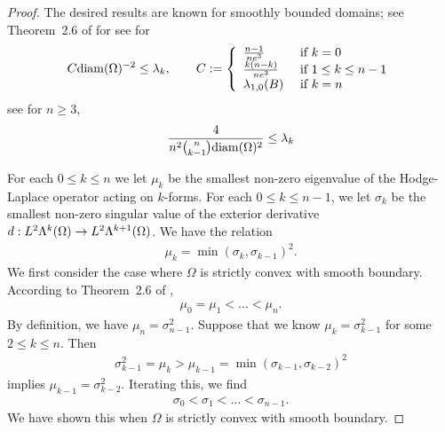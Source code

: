 \documentclass[12pt,a4paper]{article}
\begin{document}
\begin{proof}
    The desired results are known for smoothly bounded domains;
    see Theorem~2.6 of \cite{guerini2004eigenvalue} for %
    see \cite[Theorem~1.3]{guerini2004spectre} for
    \begin{align*}
        C \diam(\Omega)^{-2} 
        \leq 
        \lambda_{k},
        \qquad 
        C := 
        \left\{\begin{array}{ll}
            \frac{n-1}{n e^{3}} & \text{ if } k=0
            \\
            \frac{k(n-k)}{ne^{3}} & \text{ if } 1 \leq k \leq n-1
            \\
            \lambda_{1,0}(B) & \text{ if } k = n %
        \end{array}\right. 
    \end{align*}
    see \cite{guerini2004eigenvalue} for $n \geq 3$, 
    \begin{align*}
        \frac{4}{n^{2} \tbinom{n}{k-1} {\operatorname{diam}}(\Omega)^{2} } \leq \lambda_{k}
    \end{align*}
    
    For each $0 \leq k \leq n$ we let $\mu_{k}$ be the smallest non-zero eigenvalue of the Hodge-Laplace operator acting on $k$-forms. For each $0 \leq k \leq n-1$, we let $\sigma_{k}$ be the smallest non-zero singular value of the exterior derivative $d : L^{2}\Lambda^{k}(\Omega) \rightarrow L^{2}\Lambda^{k+1}(\Omega)$. We have the relation
    \begin{align*}
        \mu_{k} = \min( \sigma_{k}, \sigma_{k-1} )^{2}.
    \end{align*}
    We first consider the case where $\Omega$ is strictly convex with smooth boundary. 
    According to Theorem~2.6 of \cite{guerini2004eigenvalue},
    \begin{align*}
        \mu_{0} = \mu_{1} < \dots < \mu_{n}.
    \end{align*}
    By definition, we have $\mu_{n} = \sigma_{n-1}^{2}$. 
    Suppose that we know $\mu_{k} = \sigma_{k-1}^{2}$ for some $2 \leq k \leq n$. Then 
    \begin{align*}
        \sigma_{k-1}^{2} = \mu_{k} > \mu_{k-1} = \min( \sigma_{k-1}, \sigma_{k-2} )^{2}
    \end{align*}
    implies $\mu_{k-1} = \sigma_{k-2}^{2}$. 
    Iterating this, we find 
    \begin{align*}
        \sigma_{0} < \sigma_{1} < \dots < \sigma_{n-1}.
    \end{align*}
    We have shown this when $\Omega$ is strictly convex with smooth boundary. 
    

\end{proof}
\end{document}
